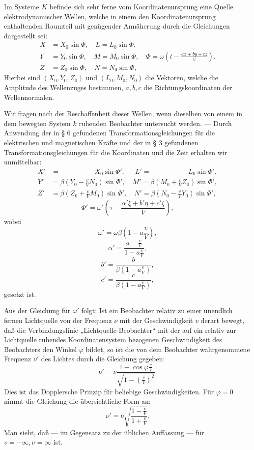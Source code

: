 \documentclass[17pt]{webarticle}       %
\begin{document}
Im Systeme \( K \) befinde sich sehr ferne vom Koordinatenursprung eine Quelle elektrodynamischer Wellen, welche in einem den Koordinatenursprung enthaltenden Raumteil mit genügender Annäherung durch die Gleichungen dargestellt sei:
\[
\begin{align*}
X &= X_0 \sin \Phi, \quad L = L_0 \sin \Phi,
\\
Y &= Y_0 \sin \Phi, \quad M = M_0 \sin \Phi, \quad \Phi = \omega \left( t - \frac{ax + by + cz}{V} \right).
\\
Z &= Z_0 \sin \Phi, \quad N = N_0 \sin \Phi,
\end{align*}
\]
Hierbei sind \( (X_0, Y_0, Z_0) \) und \( (L_0, M_0, N_0) \) die Vektoren, welche die Amplitude des Wellenzuges bestimmen, \( a, b, c \) die Richtungskoordinaten der Wellennormalen.

Wir fragen nach der Beschaffenheit dieser Wellen, wenn dieselben von einem in dem bewegten System \( k \) ruhenden Beobachter untersucht werden. — Durch Anwendung der in § 6 gefundenen Transformationsgleichungen für die elektrischen und magnetischen Kräfte und der in § 3 gefundenen Transformationsgleichungen für die Koordinaten und die Zeit erhalten wir unmittelbar:
\[
\begin{align*}
X' &= \qquad \qquad \quad X_0 \sin \Phi', \quad \ \ L' = \qquad \qquad \quad \ \, L_0 \sin \Phi',
\\
Y' &= \beta \left( Y_0 - \frac{v}{V} N_0 \right) \sin \Phi', \quad M' = \beta \left( M_0 + \frac{v}{V} Z_0 \right) \sin \Phi',
\\
Z' &= \beta \left( Z_0 + \frac{v}{V} M_0 \right) \sin \Phi', \quad N' = \beta \left( N_0 - \frac{v}{V} Y_0 \right) \sin \Phi',
\end{align*}
\]
\[
\Phi' = \omega' \left( \tau - \frac{\alpha' \xi + b' \eta + c' \zeta}{V} \right),
\]
wobei
\[
\omega' = \omega \beta \left( 1 - a \frac{v}{V} \right),
\]
\[
\alpha' = \frac{a - \frac{v}{V}}{1 - a \frac{v}{V}},
\]
\[
b' = \frac{b}{\beta \left( 1 - a \frac{v}{V} \right)},
\]
\[
c' = \frac{c}{\beta \left( 1 - a \frac{v}{V} \right)},
\]
gesetzt ist.

Aus der Gleichung für \(\omega'\) folgt: Ist ein Beobachter relativ zu einer unendlich fernen Lichtquelle von der Frequenz \( \nu \) mit der Geschwindigkeit \( v \) derart bewegt, daß die Verbindungslinie „Lichtquelle-Beobachter“ mit der auf ein relativ zur Lichtquelle ruhendes Koordinatensystem bezogenen Geschwindigkeit des Beobachters den Winkel \(\varphi\) bildet, so ist die von dem Beobachter wahrgenommene Frequenz \( \nu' \) des Lichtes durch die Gleichung gegeben:
\[
\nu' = \nu \frac{1 - \cos \varphi \frac{v}{V}}{\sqrt{1 - \left(\frac{v}{V}\right)^2}}.
\]
Dies ist das Dopplersche Prinzip für beliebige Geschwindigkeiten. Für \(\varphi = 0\) nimmt die Gleichung die übersichtliche Form an:
\[
\nu' = \nu \sqrt{\frac{1 - \frac{v}{V}}{1 + \frac{v}{V}}}.
\]
Man sieht, daß — im Gegensatz zu der üblichen Auffassung — für \( v = -\infty, \nu = \infty \) ist.
\end{document}
